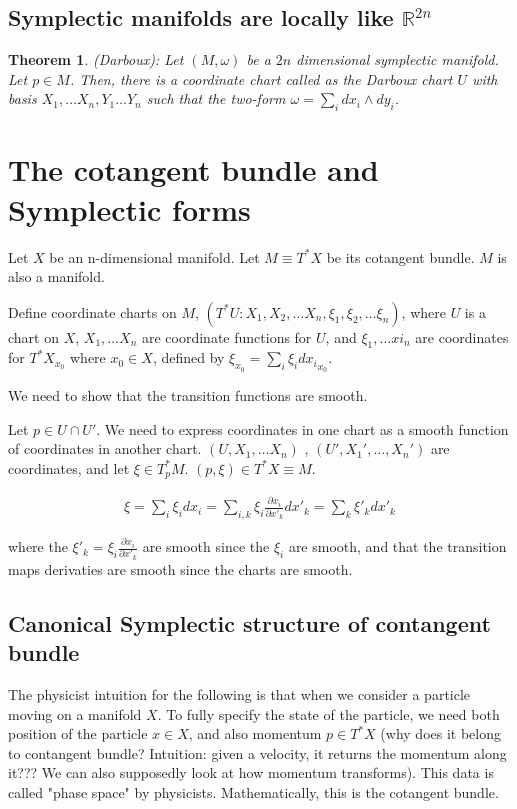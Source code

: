 \documentclass[11pt]{book}
\newcommand{\R}{\ensuremath{\mathbb R}}
\newtheorem{theorem}{Theorem}
\begin{document}
\subsection{Symplectic manifolds are locally like $\R^{2n}$}
\begin{theorem} (Darboux): Let $(M, \omega)$ be a $2n$ dimensional symplectic
    manifold. Let $p \in M$. Then, there is a coordinate chart called 
    as the Darboux chart $U$ with basis $X_1, \dots X_n, Y_1 \dots Y_n$ such that
    the two-form $\omega = \sum_i dx_i \wedge dy_i$.
\end{theorem}

\section{The cotangent bundle and Symplectic forms}

Let $X$ be an n-dimensional manifold. Let $M \equiv T^*X$ be its cotangent
bundle.  $M$ is also a manifold.

Define coordinate charts on $M$, $(T^*U: X_1, X_2, \dots X_n, \xi_1, \xi_2, \dots \xi_n)$,
where $U$ is a chart on $X$, $X_1, \dots X_n$ are coordinate functions for $U$,
and $\xi_1, \dots xi_n$ are coordinates for $T^*X_{x_0}$ where $x_0 \in X$, defined
by $\xi_{x_0} = \sum_i \xi_i {dx_i}_{x_0}$.

We need to show that the transition functions are smooth.

Let $p \in U \cap U'$. We need to express coordinates in one chart
as a smooth function of coordinates in another chart. $(U, X_1, \dots X_n)$
, $(U', X_1', \dots, X_n')$ are coordinates, and let $\xi \in T_p^* M$.
$(p, \xi) \in T^*X \equiv M$.


\begin{align*}
    \xi = \sum_i \xi_i dx_i = \sum_{i, k} \xi_i \frac{\partial x_i}{\partial x'_k} dx'_k = \sum_k \xi'_k dx'_k
\end{align*}

where the $\xi'_k = \xi_i \frac{\partial x_i}{\partial x'_k}$ are smooth since
the $\xi_i$ are smooth, and that the transition maps derivaties are smooth
since the charts are smooth.

\subsection{Canonical Symplectic structure of contangent bundle}

The physicist intuition for the following is that when we consider
a particle moving on a manifold $X$. To fully specify the state of the
particle, we need both position of the particle $x \in X$, and also
momentum $p \in T^*X$ (why does it belong to contangent bundle? Intuition:
given a velocity, it returns the momentum along it??? We can also supposedly
look at how momentum transforms).
This data is called "phase space" by physicists. Mathematically, this
is the cotangent bundle.
\end{document}

